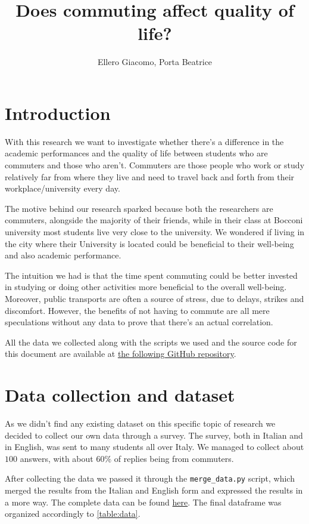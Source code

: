 \documentclass[11pt]{extarticle}
\title{\vspace{-1.5cm}Does commuting affect quality of life?\vspace{-0.5cm}}
\author{Ellero Giacomo, Porta Beatrice}
\date{}
\numberwithin{table}{section}
\numberwithin{figure}{section}
\numberwithin{equation}{section}
\begin{document}
\maketitle
\vspace{-1cm}

\section{Introduction}

With this research we want to investigate whether there’s a difference in the academic performances
and the quality of life between students who are commuters and those who aren't.
Commuters are those people who work or study relatively far from where they live
and need to travel back and forth from their workplace/university every day.

The motive behind our research sparked because both the researchers are commuters,
alongside the majority of their friends, while in their class at Bocconi university most students
live very close to the university.
We wondered if living in the city where their University is located could be beneficial
to their well-being and also academic performance.

The intuition we had is that the time spent commuting could be better invested in studying
or doing other activities more beneficial to the overall well-being.
Moreover, public transports are often a source of stress, due to delays, strikes and discomfort.
However, the benefits of not having to commute are all mere speculations without any data to prove
that there’s an actual correlation.

All the data we collected along with the scripts we used and the source code for this document
are available at
\href{https://github.com/billy4479/stats-research-project}{the following GitHub repository}.

\section{Data collection and dataset}

As we didn't find any existing dataset on this specific topic of research we decided
to collect our own data through a survey.
The survey, both in Italian and in English, was sent to many students all over Italy.
We managed to collect about $100$ answers, with about $60\%$ of replies being from commuters.

After collecting the data we passed it through the \texttt{merge\_data.py} script,
which merged the results from the Italian and English form and expressed the results in a more
 way.
The complete data can be found
\href{https://github.com/billy4479/stats-research-project/blob/master/data/merged.csv}{here}.
The final dataframe was organized accordingly to \cref{table:data}.
\end{document}
